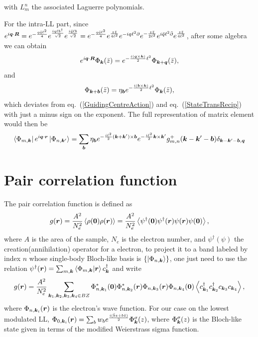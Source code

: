 \documentclass[%
nofootinbib,
 amsmath,amssymb,
 aps,onecolumn,
prb
]{revtex4-2}
\newcommand{\zz}{\bar{z}}
\newcommand{\overpartial}{\bar{\partial}}
\begin{document}
with $L_m^n$ the associated Laguerre polynomials. \par
For the intra-LL part, since $e^{i\vb*{q}\cdot\vb*{R}}=e^{-\frac{q\bar{q}\ell^2}{4}}e^{\frac{iq\ell b^\dag}{\sqrt{2}}}e^{\frac{i\bar{q}\ell b}{\sqrt{2}}}=e^{-\frac{q\bar{q}\ell^2}{4}}e^{\frac{z\zz}{4\ell^2}}e^{-iq\ell^2\partial}e^{-\frac{z\zz}{2\ell^2}}e^{i\bar{q}\ell^2\overpartial}e^{\frac{z\zz}{4\ell^2}}$,
after some algebra we can obtain 
\begin{equation}
    e^{i\vb*{q}\cdot\vb*{R}}\Phi_{\vb*{k}}(\zz)=e^{-\frac{i(\vb*{q}\times\vb*{k})}{2}\ell^2}\Phi_{\vb*{k}+\vb*{q}}(\zz),
\end{equation}
and
\begin{equation}
    \Phi_{\vb*{k}+\vb*{b}}(\zz)=\eta_{\vb*{b}}e^{-\frac{i(\vb*{b}\times\vb*{k})}{2}\ell^2}\Phi_{\vb*{k}}(\zz),
\end{equation}
which deviates from eq.~(\ref{GuidingCentreAction}) and eq.~(\ref{StateTransRecip}) with just a minus sign on the exponent. The full representation of matrix element would then be 
\begin{equation}\label{MatrixElements}
    \bra{\Phi_{m,\vb*{k}}}e^{i\vb*{q}\cdot\vb*{r}}\ket{\Phi_{n,\vb*{k}^\prime}}=\sum_{\vb*{b}}
    \eta_{\vb*{b}}e^{-\frac{i\ell^2}{2}(\vb*{k}+\vb*{k}^\prime)\times\vb*{b}}e^{-\frac{i\ell^2}{2}\vb*{k}\times\vb*{k}^\prime}g^+_{m,n}(\vb*{k}-\vb*{k}^\prime-\vb*{b})
    \delta_{\vb*{k}-\vb*{k}^\prime-\vb*{b},\vb*{q}}
\end{equation}
\section{Pair correlation function}
The pair correlation function is defined as 
\begin{equation}
    g(\vb*{r})=\frac{A^2}{N_e^2}\expval{\rho(\vb*{0})\rho(\vb*{r})}=\frac{A^2}{N_e^2}\expval{\psi^\dag(\vb*{0})\psi^\dag(\vb*{r})\psi(\vb*{r})\psi(\vb*{0})},
\end{equation}
where $A$ is the area of the sample, $N_e$ is the electron number, and $\psi^\dag(\psi)$ the creation(annihilation) operator for a electron, to project it to a band labeled by index $n$ whose single-body Bloch-like basis is $\{\ket{\Phi_{n,\vb*{k}}}\}$, one just need to use 
the relation $\psi^\dag(\vb*{r})=\sum_{m,\vb*{k}}\braket{\Phi_{m,\vb*{k}}}{\vb*{r}}c^\dag_{\vb*{k}}$ and write 
\begin{equation}
    g(\vb*{r})=\frac{A^2}{N_e^2}\sum_{\vb*{k}_1,\vb*{k}_2,\vb*{k}_3,\vb*{k}_4\in BZ}
    \Phi^\ast_{n,\vb*{k}_1}(\vb*{0}) \Phi^\ast_{n,\vb*{k}_2}(\vb*{r}) \Phi_{n,\vb*{k}_3}(\vb*{r})\Phi_{n,\vb*{k}_4}(\vb*{0})\expval{c^\dag_{\vb*{k}_1}c^\dag_{\vb*{k}_2}c_{\vb*{k}_3}c_{\vb*{k}_4}},
\end{equation}
where $\Phi_{n,\vb*{k}_i}(\vb*{r})$ is the electron's wave function. For our case on the lowest modulated LL, $\Phi_{0,\vb*{k}_i}(\vb*{r})=\sum_{b}w_{b}e^{\frac{i(\bar{b}z+b\bar{z})}{2}}\Phi^\sigma_{\vb*{k}}(z)$, where 
$\Phi^\sigma_{\vb*{k}}(z)$ is the Bloch-like state given in terms of the modified Weierstrass sigma function. 
\end{document}
